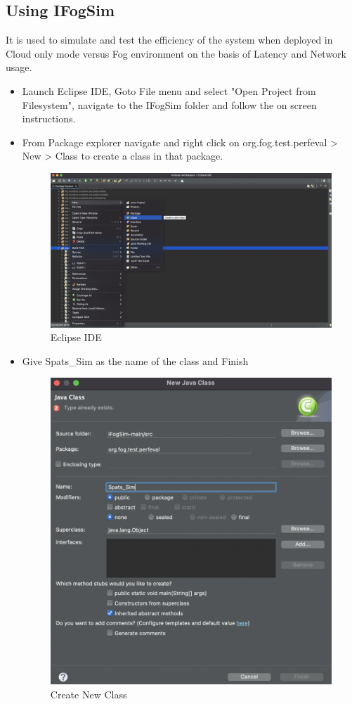 \documentclass[10pt]{article}
\begin{document}
\subsection{Using IFogSim}
It is used to simulate and test the efficiency of the system when deployed in Cloud only mode versus Fog environment on the basis of Latency and Network usage.
\begin{itemize}
    \item Launch Eclipse IDE, Goto File menu and select "Open Project from Filesystem", navigate to the IFogSim folder and follow the on screen instructions.
    
    \item From Package explorer navigate and right click on org.fog.test.perfeval > New > Class to create a class in that package. 
    \begin{figure}[H]
    \begin{center}
        \includegraphics[width=0.7\linewidth, frame]{CA2-template/CM33.png}
       \caption{Eclipse IDE \label{fig:23}}
    \end{center}
\end{figure}

\item Give Spats\_Sim as the name of the class and Finish
\begin{figure}[H]
    \begin{center}
        \includegraphics[width=0.7\linewidth, frame]{CA2-template/CM34.png}
       \caption{Create New Class \label{fig:24}}
    \end{center}
\end{figure}


\end{itemize}
\end{document}
